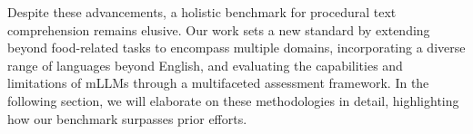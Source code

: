 Despite these advancements, a holistic benchmark for procedural text comprehension remains elusive. Our work sets a new standard by extending beyond food-related tasks to encompass multiple domains, incorporating a diverse range of languages beyond English, and evaluating the capabilities and limitations of mLLMs through a multifaceted assessment framework. In the following section, we will elaborate on these methodologies in detail, highlighting how our benchmark surpasses prior efforts.

